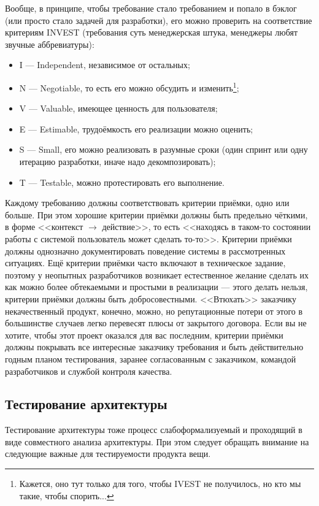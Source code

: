 \documentclass{../../text-style}
\begin{document}
Вообще, в принципе, чтобы требование стало требованием и попало в бэклог (или просто стало задачей для разработки), его можно проверить на соответствие критериям INVEST (требования суть менеджерская штука, менеджеры любят звучные аббревиатуры):

\begin{itemize}
    \item I --- Independent, независимое от остальных;
    \item N --- Negotiable, то есть его можно обсудить и изменить\footnote{Кажется, оно тут только для того, чтобы IVEST не получилось, но кто мы такие, чтобы спорить...};
    \item V --- Valuable, имеющее ценность для пользователя;
    \item E --- Estimable, трудоёмкость его реализации можно оценить;
    \item S --- Small, его можно реализовать в разумные сроки (один спринт или одну итерацию разработки, иначе надо декомпозировать);
    \item T --- Testable, можно протестировать его выполнение.
\end{itemize}

Каждому требованию должны соответствовать критерии приёмки, одно или больше. При этом хорошие критерии приёмки должны быть предельно чёткими, в форме <<контекст $\to$ действие>>, то есть <<находясь в таком-то состоянии работы с системой пользователь может сделать то-то>>. Критерии приёмки должны однозначно документировать поведение системы в рассмотренных ситуациях. Ещё критерии приёмки часто включают в техническое задание, поэтому у неопытных разработчиков возникает естественное желание сделать их как можно более обтекаемыми и простыми в реализации --- этого делать нельзя, критерии приёмки должны быть добросовестными. <<Втюхать>> заказчику некачественный продукт, конечно, можно, но репутационные потери от этого в большинстве случаев легко перевесят плюсы от закрытого договора. Если вы не хотите, чтобы этот проект оказался для вас последним, критерии приёмки должны покрывать все интересные заказчику требования и быть действительно годным планом тестирования, заранее согласованным с заказчиком, командой разработчиков и службой контроля качества.

\subsection{Тестирование архитектуры}

Тестирование архитектуры тоже процесс слабоформализуемый и проходящий в виде совместного анализа архитектуры. При этом следует обращать внимание на следующие важные для тестируемости продукта вещи.
\end{document}
